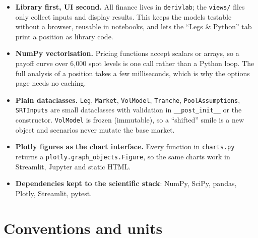 \documentclass[10pt,a4paper]{article}
\providecommand{\tightlist}{\setlength{\itemsep}{1pt}\setlength{\parskip}{0pt}}
\numberwithin{equation}{section}
\begin{document}
\begin{itemize}
\tightlist
\item
  \textbf{Library first, UI second.} All finance lives in \texttt{derivlab}; the \texttt{views/} files only collect inputs and display results. This keeps the models testable without a browser, reusable in notebooks, and lets the ``Legs \& Python'' tab print a position as library code.
\item
  \textbf{NumPy vectorisation.} Pricing functions accept scalars or arrays, so a payoff curve over 6,000 spot levels is one call rather than a Python loop. The full analysis of a position takes a few milliseconds, which is why the options page needs no caching.
\item
  \textbf{Plain dataclasses.} \texttt{Leg}, \texttt{Market}, \texttt{VolModel}, \texttt{Tranche}, \texttt{PoolAssumptions}, \texttt{SRTInputs} are small dataclasses with validation in \texttt{\_\_post\_init\_\_} or the constructor. \texttt{VolModel} is frozen (immutable), so a ``shifted'' smile is a new object and scenarios never mutate the base market.
\item
  \textbf{Plotly figures as the chart interface.} Every function in \texttt{charts.py} returns a \texttt{plotly.graph\_objects.Figure}, so the same charts work in Streamlit, Jupyter and static HTML.
\item
  \textbf{Dependencies kept to the scientific stack}: NumPy, SciPy, pandas, Plotly, Streamlit, pytest.
\end{itemize}

\section{Conventions and units}\label{conventions-and-units}
\end{document}
